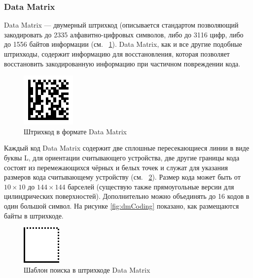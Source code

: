 \subsubsection{Data Matrix}
Data Matrix --- двумерный штрихкод (описывается стандартом 
позволяющий 
закодировать до 2335 алфавитно-цифровых символов, либо до 3116 цифр, 
либо до 1556 байтов информации (см. \figurename\ \ref{fig:dmSample}). 
Data Matrix, как и все другие подобные 
штрихкоды, содержит информацию для восстановления, которая позволяет 
восстановить закодированную информацию при частичном повреждении кода.

\begin{figure}[htb]
    \centering
    \includegraphics{img/dm_sample}
    \caption{Штрихкод в формате Data Matrix}
    \label{fig:dmSample}
\end{figure}

Каждый код Data Matrix содержит две сплошные пересекающиеся линии в 
виде буквы L, для ориентации считывающего устройства, две другие 
границы кода состоят из перемежающихся чёрных и белых точек и служат для 
указания размеров кода считывающему устройству 
(см. \figurename\ \ref{fig:dmPattern}). Размер кода может быть от
$10 \times 10$ до $144 \times 144$ барселей (существую также 
прямоугольные версии для цилиндрических поверхностей). Дополнительно
можно объединять до 16 кодов в один большой символ.
На рисунке \ref{fig:dmCoding} показано,
как размещаются байты в штрихкоде.

\begin{figure}[htb]
    \centering
    \includegraphics{img/dm_pattern}
    \caption{Шаблон поиска в штрихкоде Data Matrix}
    \label{fig:dmPattern}
\end{figure}


